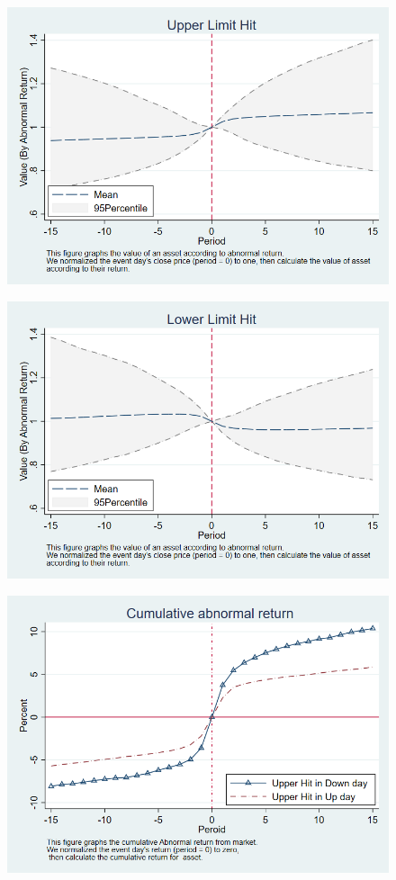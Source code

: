 \documentclass[12pt]{article}
\begin{document}
\begin{figure}[htbp]
\centering
\includegraphics[width=0.7\linewidth]{95U}
\caption{}
\label{fig:95u}
\end{figure}
\begin{figure}[htbp]
\centering
\includegraphics[width=0.7\linewidth]{95L}
\caption{}
\label{fig:95l}
\end{figure}
\begin{figure}[htbp]
\centering
\includegraphics[width=0.7\linewidth]{UPNAbR}
\caption{}
\label{fig:UPNAbR}
\end{figure}
\end{document}

